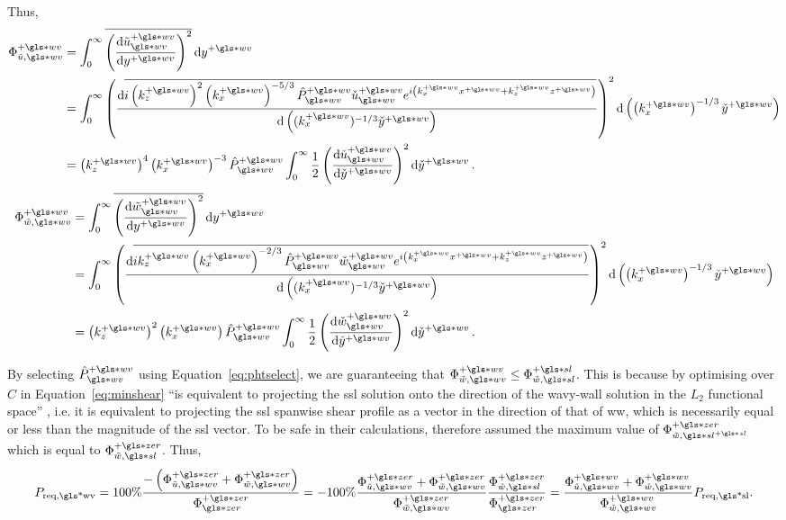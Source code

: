 Thus,
\begin{align}
	\Phi _{\tilde{u},\gls*{wv}}\pw &= \int_{0}^{\infty} \overline{\left( \dv{\tilde{u}\ww\pw}{y\pw}  \right) ^2} \dd{y\pw}   \\
				       &= \int_{0}^{\infty} \left( \dv{\overline{i\left( k_z\pw \right) ^2 \left( k_x\pw \right) ^{-5 /3}  \hat{P}\pw\ww \check{u}\pw\ww e^{i\left( k_x\pw x\pw +k_z \pw z\pw \right)}}}{\left((k_x\pw)^{-1 /3}\check{y}\pw\right)}  \right) ^2 \dd{\left(\left(k_x\pw\right)^{-1 /3}\check{y}\pw\right)}   \\
				       &= \left(k_z\pw\right)^4\left(k_x\pw\right)^{-3}\hat{P}\ww\pw\int_{0}^{\infty}\frac{1}{2} \left( \dv{\check{u}\ww\pw}{\check{y}\pw}  \right) ^2 \dd{\check{y}\pw} \label{eq:fiwwpwu}
.\end{align}
\begin{align}
	\Phi _{\tilde{w},\gls*{wv}}\pw &= \int_{0}^{\infty} \overline{\left( \dv{\tilde{w}\ww\pw}{y\pw}  \right) ^2} \dd{y\pw}   \\
				       &= \int_{0}^{\infty} \left( \dv{\overline{ik_z\pw \left( k_x\pw \right) ^{-2 /3}\hat{P}\pw\ww \check{w}\pw\ww e^{i\left( k_x\pw x\pw +k_z \pw z\pw \right)}}}{\left((k_x\pw)^{-1 /3}\check{y}\pw\right)}  \right) ^2 \dd{\left(\left(k_x\pw\right)^{-1 /3}\check{y}\pw\right)}   \\
				       &= \left(k_z\pw\right)^{2}\left(k_x\pw\right)\hat{P}\ww\pw\int_{0}^{\infty}\frac{1}{2} \left( \dv{\check{w}\ww\pw}{\check{y}\pw}  \right) ^2 \dd{\check{y}\pw} \label{eq:fiwwpww}
.\end{align}

By selecting  $\hat{P}\ww\pw$ using Equation~\eqref{eq:phtselect}, we are guaranteeing that $\Phi _{\tilde{w},\gls*{wv}}\pw\leq\Phi _{\tilde{w},\gls*{sl}}\ps$. This is because by optimising over $C$ in Equation~\eqref{eq:minshear} ``is equivalent to projecting the \gls{ssl} solution onto the direction of the wavy-wall solution in the $L_2$ functional space'' \cite{chernyshenko2013}, i.e. it is equivalent to projecting the \gls{ssl} spanwise shear profile as a vector in the direction of that of \gls{ww}, which is necessarily equal or less than the magnitude of the \gls{ssl} vector. To be safe in their calculations, \textcite{chernyshenko2013} therefore assumed the maximum value of $\Phi _{\tilde{w},\gls*{sl}\ps}\pz$ which is equal to $\Phi _{\tilde{w},\gls*{sl}}\pz$. Thus,
\begin{equation}
	P_\text{req,\gls*{wv}} = 100\% \frac{-\left(\Phi _{\tilde{u},\gls*{wv}}\pz+\Phi _{\tilde{w},\gls*{wv}}\pz\right)}{\Phi \zz\pz}
	= -100\% \frac{\Phi _{\tilde{u},\gls*{wv}}\pz+\Phi _{\tilde{w},\gls*{wv}}\pz}{\Phi _{\tilde{w},\gls*{wv}}\pz}\frac{\Phi _{\tilde{w},\gls*{sl}}\pz}{\Phi \zz\pz}
	= \frac{\Phi _{\tilde{u},\gls*{wv}}\pw+\Phi _{\tilde{w},\gls*{wv}}\pw}{\Phi _{\tilde{w},\gls*{wv}}\pw}P_\text{req,\gls*{sl}}
.\end{equation}


